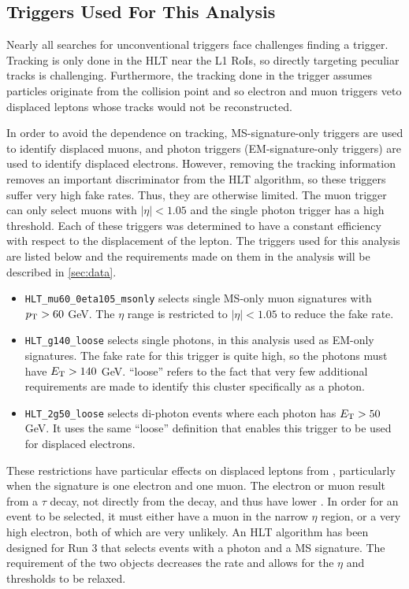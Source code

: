 \subsection{Triggers Used For This Analysis}

Nearly all searches for unconventional triggers face challenges finding a trigger. Tracking is only done in the \ac{HLT} near the \ac{L1} \acp{RoI}, so directly targeting peculiar tracks is challenging. Furthermore, the tracking done in the trigger assumes particles originate from the collision point and so electron and muon triggers veto displaced leptons whose tracks would not be reconstructed.

In order to avoid the dependence on tracking, \ac{MS}-signature-only triggers are used to identify displaced muons, and photon triggers (\ac{EM}-signature-only triggers) are used to identify displaced electrons. However, removing the tracking information removes an important discriminator from the \ac{HLT} algorithm, so these triggers suffer very high fake rates. Thus, they are otherwise limited. The muon trigger can only select muons with $|\eta| < 1.05$ and the single photon trigger has a high \pt threshold. Each of these triggers was determined to have a constant efficiency with respect to the displacement of the lepton. The triggers used for this analysis are listed below and the requirements made on them in the analysis will be described in \autoref{sec:data}.

\begin{itemize}
	\item \texttt{HLT\_mu60\_0eta105\_msonly} selects single \ac{MS}-only muon signatures with $p_{\text{T}} > 60$ GeV. The $\eta$ range is restricted to $|\eta| < 1.05$ to reduce the fake rate.
	\item \texttt{HLT\_g140\_loose} selects single photons, in this analysis used as \ac{EM}-only signatures. The fake rate for this trigger is quite high, so the photons must have $E_{\text{T}} > 140$ GeV. ``loose'' refers to the fact that very few additional requirements are made to identify this cluster specifically as a photon.
	\item \texttt{HLT\_2g50\_loose} selects di-photon events where each photon has $E_{\text{T}} > 50$ GeV. It uses the same ``loose'' definition that enables this trigger to be used for displaced electrons.
\end{itemize}


These restrictions have particular effects on displaced leptons from \stau, particularly when the signature is one electron and one muon. The electron or muon result from a $\tau$ decay, not directly from the \stau decay, and thus have lower \pt. In order for an event to be selected, it must either have a muon in the narrow $\eta$ region, or a very high \pt electron, both of which are very unlikely. An \ac{HLT} algorithm has been designed for Run 3 that selects events with a photon and a \ac{MS} signature. The requirement of the two objects decreases the rate and allows for the $\eta$ and \pt thresholds to be relaxed. 



